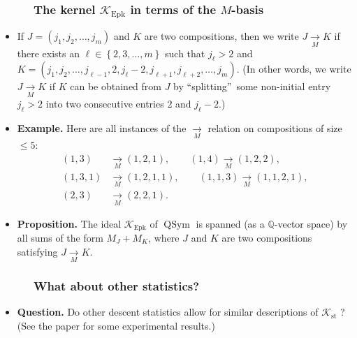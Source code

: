 \documentclass{beamer}
\newcommand{\Epk}{\operatorname{Epk}}
\newcommand{\st}{\operatorname{st}}
\newcommand{\calK}{\mathcal{K}}
\newcommand{\fti}[1]{\frametitle{\ \ \ \ \ #1}}
\newcommand{\defn}[1]{{\color{darkred}\emph{#1}}} %
\theoremstyle{plain}
\begin{document}
\begin{frame}
\fti{The kernel $\calK_{\Epk}$ in terms of the $M$-basis}

\begin{itemize}

\item If $J=\left(  j_{1},j_{2},\ldots,j_{m}\right)  $ and $K$
are two compositions, then we write \defn{$J\underset{M}{\rightarrow}K$} if
there exists an $\ell\in\left\{  2,3,\ldots,m\right\}  $ such that $j_{\ell
}>2$ and $K=\left(  j_{1},j_{2},\ldots,j_{\ell-1},2,j_{\ell}-2,j_{\ell
+1},j_{\ell+2},\ldots,j_{m}\right)  $. (In other words, we write
$J\underset{M}{\rightarrow}K$ if $K$ can be obtained from $J$ by
\textquotedblleft splitting\textquotedblright\ some non-initial entry
$j_{\ell}>2$ into
two consecutive entries $2$ and $j_{\ell}-2$.)

\item \textbf{Example.} Here are all instances of the $\underset{M}{\rightarrow}$ relation
on compositions of size $\leq 5$:
\begin{align*}
\left(  1,3\right)  &\underset{M}{\rightarrow}\left(  1,2,1\right)  ,\qquad
\left(  1,4\right)    \underset{M}{\rightarrow}\left(  1,2,2\right)  ,\\
\left(  1,3,1\right)   &  \underset{M}{\rightarrow}\left(  1,2,1,1\right)  ,\qquad
\left(  1,1,3\right)    \underset{M}{\rightarrow}\left(  1,1,2,1\right)  ,\\
\left(  2,3\right)   &  \underset{M}{\rightarrow}\left(  2,2,1\right)  .
\end{align*}

\item \textbf{Proposition.}
The ideal $\mathcal{K}_{\operatorname*{Epk}}$ of $\operatorname*{QSym}$ is
spanned (as a $\mathbb{Q}$-vector space) by all sums of the form $M_{J}+M_{K}%
$, where $J$ and $K$ are two compositions satisfying
$J\underset{M}{\rightarrow}K$.

\end{itemize}

\end{frame}

\begin{frame}
\fti{What about other statistics?}

\begin{itemize}

\item \textbf{Question.}
      Do other descent statistics allow for similar descriptions of
      $\calK_{\st}$ ? \\
      (See the paper for some experimental results.)

\end{itemize}

\end{frame}
\end{document}
